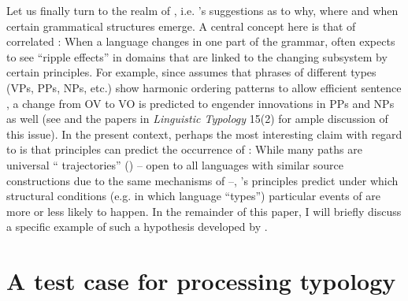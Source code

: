 \documentclass[output=paper]{langsci/langscibook}
\begin{document}
Let us finally turn to the realm of \textsc{}, i.e. ’s suggestions as to why, where and when certain grammatical structures emerge. A central concept here is that of correlated : When a language changes in one part of the grammar,  often expects to see “ripple effects” \citep[88]{Hawkins2014_VarEff} in domains that are linked to the changing subsystem by certain  principles. For example, since  assumes that phrases of different types (VPs, PPs, NPs, etc.) show harmonic ordering patterns to allow efficient sentence , a change from OV to VO is predicted to engender innovations in PPs and NPs as well (see \citealt{DunnEtAl2011} and the papers in \textit{Linguistic Typology} 15(2) for ample discussion of this issue). In the present context, perhaps the most interesting claim with regard to  is that  principles can predict the occurrence of : While many  paths are universal “ trajectories” (\citealt{BybeeBeckner2015}) – open to all languages with similar source constructions due to the same mechanisms of  –, 's  principles predict under which structural conditions (e.g. in which language “types”) particular events of  are more or less likely to happen. In the remainder of this paper, I will briefly discuss a specific example of such a hypothesis developed by \citet{Hawkins2014_VarEff}.

\section{A test case for processing typology} 
\end{document}
